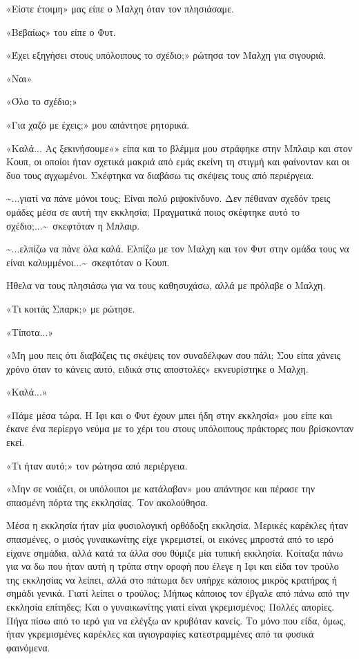 \documentclass[12pt,twoside, openany]{book}
\begin{document}
«Είστε έτοιμη» μας είπε ο Μαλχη όταν τον πλησιάσαμε.

«Βεβαίως» του είπε ο Φυτ.

«Έχει εξηγήσει στους υπόλοιπους το σχέδιο;» ρώτησα τον Μαλχη για σιγουριά.

«Ναι»

«Όλο το σχέδιο;»

«Για χαζό με έχεις;» μου απάντησε ρητορικά.

«Καλά... Ας ξεκινήσουμε«» είπα και το βλέμμα μου στράφηκε στην Μπλαιρ και στον Κουπ, οι οποίοι ήταν σχετικά μακριά από εμάς εκείνη τη στιγμή και φαίνονταν και οι δυο τους αγχωμένοι. Σκέφτηκα να διαβάσω τις σκέψεις τους από περιέργεια.

\textasciitilde ...γιατί να πάνε μόνοι τους; Είναι πολύ ριψοκίνδυνο. Δεν πέθαναν σχεδόν τρεις ομάδες μέσα σε αυτή την εκκλησία; Πραγματικά ποιος σκέφτηκε αυτό το σχέδιο;...\textasciitilde \  σκεφτόταν η Μπλαιρ.

\textasciitilde ...ελπίζω να πάνε όλα καλά. Ελπίζω με τον Μαλχη και τον Φυτ στην ομάδα τους να είναι καλυμμένοι...\textasciitilde \  σκεφτόταν ο Κουπ.

Ήθελα να τους πλησιάσω για να τους καθησυχάσω, αλλά με πρόλαβε ο Μαλχη.

«Τι κοιτάς Σπαρκ;» με ρώτησε.

«Τίποτα...»

«Μη μου πεις ότι διαβάζεις τις σκέψεις τον συναδέλφων σου πάλι; Σου είπα χάνεις χρόνο όταν το κάνεις αυτό, ειδικά στις αποστολές» εκνευρίστηκε ο Μαλχη.

«Καλά...»

«Πάμε μέσα τώρα. Η Ιφι και ο Φυτ έχουν μπει ήδη στην εκκλησία» μου είπε και έκανε ένα περίεργο νεύμα με το χέρι του στους υπόλοιπους πράκτορες που βρίσκονταν εκεί.

«Τι ήταν αυτό;» τον ρώτησα από περιέργεια.

«Μην σε νοιάζει, οι υπόλοιποι με κατάλαβαν» μου απάντησε και πέρασε την σπασμένη πόρτα της εκκλησίας. Τον ακολούθησα.

Μέσα η εκκλησία ήταν μία φυσιολογική ορθόδοξη εκκλησία. Μερικές καρέκλες ήταν σπασμένες, ο μισός γυναικωνίτης είχε γκρεμιστεί, οι εικόνες μπροστά από το ιερό είχανε σημάδια, αλλά κατά τα άλλα σου θύμιζε μία τυπική εκκλησία. Κοίταξα πάνω για να δω που ήταν αυτή η τρύπα στην οροφή που έλεγε η Ιφι και είδα τον τρούλο της εκκλησίας να λείπει, αλλά στο πάτωμα δεν υπήρχε κάποιος μικρός κρατήρας ή σημάδι γενικά. Γιατί λείπει ο τρούλος; Μήπως κάποιος τον έβγαλε από πάνω από την εκκλησία επίτηδες; Και ο γυναικωνίτης γιατί είναι γκρεμισμένος; Πολλές απορίες. Πήγα πίσω από το ιερό για να ελέγξω αν κρυβόταν κανείς. Το μόνο που είδα, όμως, ήταν γκρεμισμένες καρέκλες και αγιογραφίες κατεστραμμένες από τα φυσικά φαινόμενα.
\end{document}
